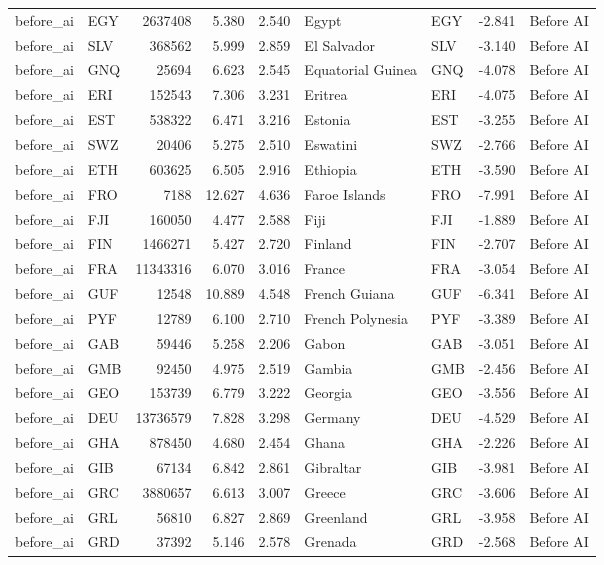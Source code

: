 \begin{tabular}{llrrrllrl}
before\_ai & EGY & 2637408 & 5.380 & 2.540 & Egypt & EGY & -2.841 & Before AI \\
before\_ai & SLV & 368562 & 5.999 & 2.859 & El Salvador & SLV & -3.140 & Before AI \\
before\_ai & GNQ & 25694 & 6.623 & 2.545 & Equatorial Guinea & GNQ & -4.078 & Before AI \\
before\_ai & ERI & 152543 & 7.306 & 3.231 & Eritrea & ERI & -4.075 & Before AI \\
before\_ai & EST & 538322 & 6.471 & 3.216 & Estonia & EST & -3.255 & Before AI \\
before\_ai & SWZ & 20406 & 5.275 & 2.510 & Eswatini & SWZ & -2.766 & Before AI \\
before\_ai & ETH & 603625 & 6.505 & 2.916 & Ethiopia & ETH & -3.590 & Before AI \\
before\_ai & FRO & 7188 & 12.627 & 4.636 & Faroe Islands & FRO & -7.991 & Before AI \\
before\_ai & FJI & 160050 & 4.477 & 2.588 & Fiji & FJI & -1.889 & Before AI \\
before\_ai & FIN & 1466271 & 5.427 & 2.720 & Finland & FIN & -2.707 & Before AI \\
before\_ai & FRA & 11343316 & 6.070 & 3.016 & France & FRA & -3.054 & Before AI \\
before\_ai & GUF & 12548 & 10.889 & 4.548 & French Guiana & GUF & -6.341 & Before AI \\
before\_ai & PYF & 12789 & 6.100 & 2.710 & French Polynesia & PYF & -3.389 & Before AI \\
before\_ai & GAB & 59446 & 5.258 & 2.206 & Gabon & GAB & -3.051 & Before AI \\
before\_ai & GMB & 92450 & 4.975 & 2.519 & Gambia & GMB & -2.456 & Before AI \\
before\_ai & GEO & 153739 & 6.779 & 3.222 & Georgia & GEO & -3.556 & Before AI \\
before\_ai & DEU & 13736579 & 7.828 & 3.298 & Germany & DEU & -4.529 & Before AI \\
before\_ai & GHA & 878450 & 4.680 & 2.454 & Ghana & GHA & -2.226 & Before AI \\
before\_ai & GIB & 67134 & 6.842 & 2.861 & Gibraltar & GIB & -3.981 & Before AI \\
before\_ai & GRC & 3880657 & 6.613 & 3.007 & Greece & GRC & -3.606 & Before AI \\
before\_ai & GRL & 56810 & 6.827 & 2.869 & Greenland & GRL & -3.958 & Before AI \\
before\_ai & GRD & 37392 & 5.146 & 2.578 & Grenada & GRD & -2.568 & Before AI \\

\end{tabular}
